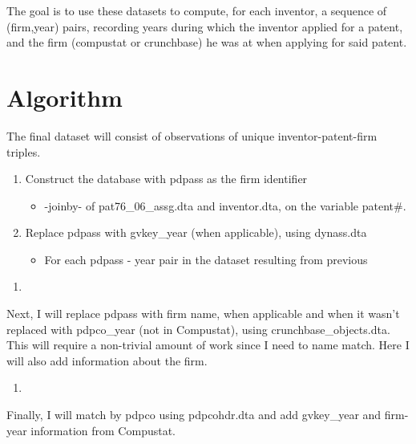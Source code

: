 \documentclass[12pt,english]{article}
\theoremstyle{remark}
\begin{document}
The goal is to use these datasets to compute, for each inventor, a sequence of (firm,year) pairs, recording years during which the inventor applied for a patent, and the firm (compustat or crunchbase) he was at when applying for said patent. 

\section{Algorithm}

The final dataset will consist of observations of unique inventor-patent-firm triples.

\begin{enumerate}
	\item Construct the database with pdpass as the firm identifier
	\begin{itemize}
		\item -joinby- of pat76\_06\_assg.dta and inventor.dta, on the variable patent\#.
	\end{itemize}
	\item Replace pdpass with gvkey\_year (when applicable), using dynass.dta
	\begin{itemize}
		\item For each pdpass - year pair in the dataset resulting from previous
	\end{itemize}
\end{enumerate}





\begin{enumerate}
	\item
\end{enumerate}


Next, I will replace pdpass with firm name, when applicable and when it wasn't replaced with pdpco\_year (not in Compustat), using crunchbase\_objects.dta. This will require a non-trivial amount of work since I need to name match. Here I will also add information about the firm.

\begin{enumerate}
	\item
\end{enumerate}

Finally, I will match by pdpco using pdpcohdr.dta and add gvkey\_year and firm-year information from Compustat. 
\end{document}
